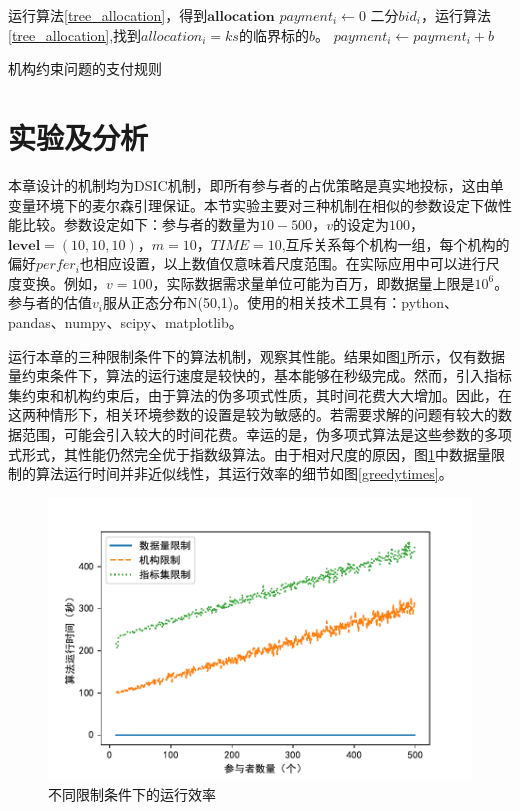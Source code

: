 \documentclass[promaster]{thesis-uestc}
\begin{document}
\begin{algorithm}[h]
    运行算法\ref{tree_allocation}，得到$\mathbf{allocation}$\;
    {
        $payment_i \leftarrow 0$\;
        {
            二分$bid_i$，运行算法\ref{tree_allocation},找到$allocation_i = ks$的临界标的$b$。
            $payment_i \leftarrow payment_i + b$
        }
    }
\caption{机构约束问题的支付规则}
\label{tree_zhifu}
\end{algorithm}

\FloatBarrier

\section{实验及分析}
本章设计的机制均为DSIC机制，即所有参与者的占优策略是真实地投标，这由单变量环境下的麦尔森引理保证。本节实验主要对三种机制在相似的参数设定下做性能比较。参数设定如下：参与者的数量为$10-500$，$v$的设定为$100$，$\mathbf{level}=(10,10,10)$，$m=10$，$TIME=10$,互斥关系每个机构一组，每个机构的偏好$perfer_i$也相应设置，以上数值仅意味着尺度范围。在实际应用中可以进行尺度变换。例如，$v=100$，实际数据需求量单位可能为百万，即数据量上限是$10^6$。参与者的估值$v_i$服从正态分布N(50,1)。使用的相关技术工具有：python、pandas、numpy、scipy、matplotlib。

运行本章的三种限制条件下的算法机制，观察其性能。结果如图\ref{times}所示，仅有数据量约束条件下，算法的运行速度是较快的，基本能够在秒级完成。然而，引入指标集约束和机构约束后，由于算法的伪多项式性质，其时间花费大大增加。因此，在这两种情形下，相关环境参数的设置是较为敏感的。若需要求解的问题有较大的数据范围，可能会引入较大的时间花费。幸运的是，伪多项式算法是这些参数的多项式形式，其性能仍然完全优于指数级算法。由于相对尺度的原因，图\ref{times}中数据量限制的算法运行时间并非近似线性，其运行效率的细节如图\ref{greedytimes}。

\begin{figure}[H]
    \includegraphics[width=350pt]{exp/threetimes.pdf}
    \caption{不同限制条件下的运行效率}
    \label{times}
\end{figure}
\end{document}
